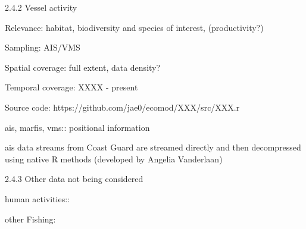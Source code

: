 \documentclass[letterpaper,portrait,12pt]{scrartcl}
\numberwithin{equation}{section}		%
\numberwithin{figure}{section}			%
\numberwithin{table}{section}				%
\begin{document}
2.4.2 Vessel activity









Relevance:  habitat, biodiversity and species of interest, (productivity?)




Sampling:  AIS/VMS




Spatial coverage: full extent, data density?




Temporal coverage: XXXX - present




Source code: https://github.com/jae0/ecomod/XXX/src/XXX.r













\begin{flushleft}

	ais, marfis, vms:: positional information

\end{flushleft}







\begin{flushleft}

	ais data streams from Coast Guard are streamed directly and then decompressed using native R methods (developed by Angelia Vanderlaan)

\end{flushleft}













2.4.3 Other data not being considered



\begin{flushleft}

	human activities::

\end{flushleft}


\begin{flushleft}

	other Fishing: 

\end{flushleft}
\end{document}
